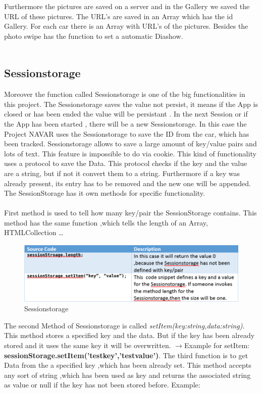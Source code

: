 Furthermore the pictures are saved on a server and in the Gallery we saved the URL of these pictures. The URL's are saved in an Array which has the id Gallery. For each car there is an Array with URL's of the pictures. Besides the photo swipe has the function to set a automatic Diashow.\\\\

\subsection{Sessionstorage}
Moreover the function called Sessionstorage is one of the big functionalities in this project. The Sessionstorage saves the value not persist, it means if the App is closed or has been ended  the value will be persistant . In the next Session or if the App has been started , there will be a new Sessionstorage. In this case the Project NAVAR uses the Sessionstorage to save the ID from the car, which has been tracked. Sessionstorage allows  to save a large amount of  key/value pairs and lots of text. This feature is impossible to do  via cookie. This kind of functionality uses  a protocol to save the Data. This protocol checks if the key and the value are a string, but if not it convert them to a string. Furthermore if a key was already present, its entry  has to be removed and the new one will be appended. The SessionStorage has it own methods for specific functionality.\\\\

First method is used to tell how many key/pair the SessionStorage contains. This method has the same function ,which tells the length of an Array, HTMLCollection \dots

\begin{figure}[h]
\centering
\includegraphics[width=1.0\linewidth]{graphics/sessionstorage1.PNG}
\caption{Sessionstorage}
\end{figure}

The second Method of Sessionstorage is called \textit{setItem(key:string,data:string)}.
 This method stores  a specified key  and the data. But if the key has been already stored and it uses the same key it will be overwritten. $\rightarrow$Example for setItem:\textbf{ sessionStorage.setItem('testkey','testvalue')}.
The third function is to get Data from the a specified key ,which has been already set. This method accepts any sort of string ,which has been used as key and returns the associated string as value or null if the key has not been stored before. Example:\\

